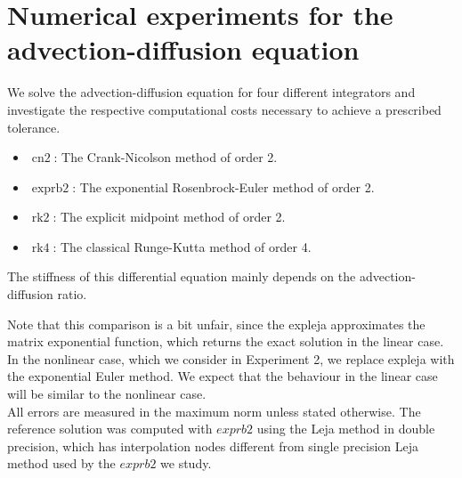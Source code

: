 \documentclass{scrartcl}
\begin{document}
\section{Numerical experiments for the advection-diffusion equation}
We solve the advection-diffusion equation for four different integrators and investigate the respective computational costs necessary to achieve a prescribed tolerance. 

\begin{itemize}
	\item $\operatorname{cn2}$: The Crank-Nicolson method of order 2.
	\item $\operatorname{exprb2}$: The exponential Rosenbrock-Euler method of order 2.
	\item $\operatorname{rk2}$: The explicit midpoint method of order 2. 
	\item $\operatorname{rk4}$: The classical Runge-Kutta method of order 4.
\end{itemize}

The stiffness of this differential equation mainly depends on the advection-diffusion ratio.   

Note that this comparison is a bit unfair, since the expleja approximates the matrix exponential function, which  returns the exact solution in the linear case. In the nonlinear case, which we consider in Experiment 2, we replace expleja with the exponential Euler method. We expect that the behaviour in the linear case will be similar to the nonlinear case. \\
All errors are measured in the maximum norm unless stated otherwise. The reference solution was computed with $exprb2$ using the Leja method in double precision, which has interpolation nodes different from single precision Leja method used by the $exprb2$ we study.
\end{document}
